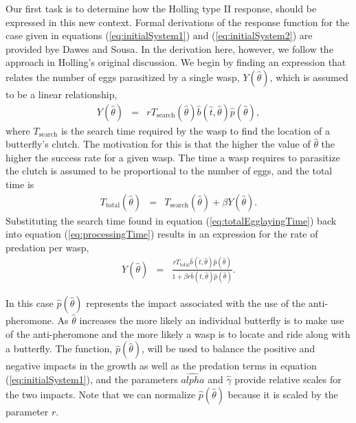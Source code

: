 \documentclass[review]{elsarticle}
\def\alpha{alpha}%
\newcommand{\origB}{\hat{b}}
\newcommand{\origAlpha}{\hat{\alpha}}
\newcommand{\origGamma}{\hat{\gamma}}
\newcommand{\origP}[1]{\hat{p}(#1)}
\newcommand{\origTheta}{\hat{\theta}}
\newcommand{\origT}{\hat{t}}
\begin{document}
Our first task is to determine how the Holling type II response,
should be expressed in this new context. Formal derivations of the
response function for the case given in equations
(\ref{eq:initialSystem1}) and (\ref{eq:initialSystem2}) are provided
bye Dawes and Sousa\cite{DAWES201311}.  In the derivation here,
however, we follow the approach in Holling's original
discussion\cite{holling_1959A,holling_1959B}. We begin by finding an
expression that relates the number of eggs parasitized by a single
wasp, $Y(\origTheta)$, which is assumed to be a linear relationship,
\begin{eqnarray}
  \label{eq:processingTime}
  Y(\origTheta) & = & r T_{\mathrm{search}}(\origTheta) \origB(\origT,\origTheta) \origP{\origTheta},
\end{eqnarray}
where $T_{\mathrm{search}}$ is the search time required by the wasp to
find the location of a butterfly's clutch. The motivation for this is
that the higher the value of $\origTheta$ the higher the success rate for
a given wasp.  The time a wasp requires to parasitize the clutch is
assumed to be proportional to the number of eggs, and the total time
is
\begin{eqnarray}
  \label{eq:totalEgglayingTime}
  T_{\mathrm{total}}(\origTheta) & = & T_{\mathrm{search}}(\origTheta) + \beta Y(\origTheta).
\end{eqnarray}
Substituting the search time found in equation
(\ref{eq:totalEgglayingTime}) back into equation
(\ref{eq:processingTime}) results in an expression for the rate of
predation per wasp,
\begin{eqnarray}
  \label{eq:waspPredationRate}
  Y(\origTheta) & = & \frac{r T_{\mathrm{total}} \origB(\origT,\origTheta) \origP{\origTheta}}{1 + \beta r \origB(\origT,\origTheta) \origP{\origTheta}}.
\end{eqnarray}

In this case $\origP{\origTheta}$ represents the impact associated with the use
of the anti-pheromone. As $\origTheta$ increases the more likely an
individual butterfly is to make use of the anti-pheromone and the more
likely a wasp is to locate and ride along with a butterfly. The
function, $\origP{\origTheta}$, will be used to balance the positive and
negative impacts in the growth as well as the predation terms in
equation (\ref{eq:initialSystem1}), and the parameters $\origAlpha$ and
$\origGamma$ provide relative scales for the two impacts. Note that we can
normalize $\origP{\origTheta}$ because it is scaled by the parameter $r$.
\end{document}
